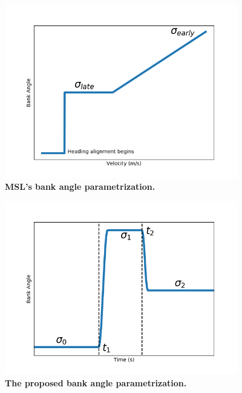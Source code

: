 \documentclass[10pt,a4paper]{article}
\begin{document}
	
	\begin{figure}
		\centering
		\includegraphics[width=4in]{MSLProfile.png}
		\caption{\bf{MSL's bank angle parametrization.}}
		\label{MSLParametrization}
	\end{figure}
	\begin{figure}
		\centering
		\includegraphics[width=4in]{BankAngleProfile.png}
		\caption{\bf{The proposed bank angle parametrization.}}
		\label{RefTrajParametrization}
	\end{figure}
	
\end{document}
